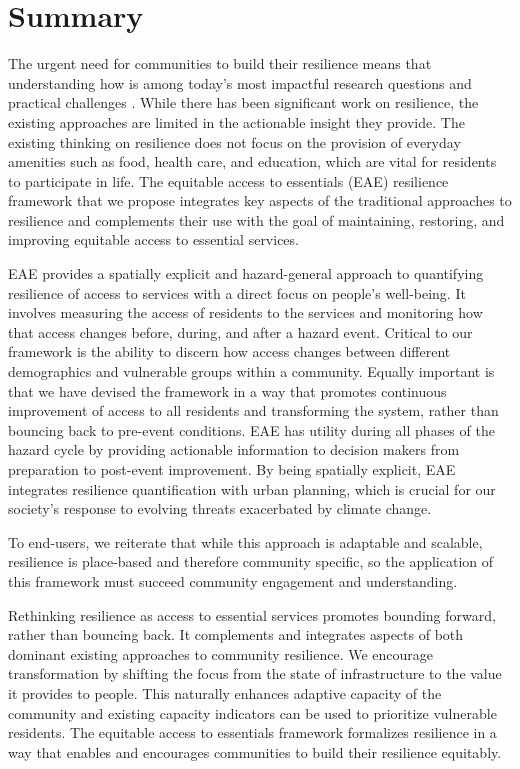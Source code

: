 \documentclass[onecolumn,doublespacing]{risa}
\let \cite \parencite
\begin{document}
\section{Summary}
\label{sec:disc}
The urgent need for communities to build their resilience means that understanding how is among today's most impactful research questions and practical challenges \cite{Caldarice2019-tv}.
While there has been significant work on resilience, the existing approaches are limited in the actionable insight they provide.
The existing thinking on resilience does not focus on the provision of everyday amenities such as food, health care, and education, which are vital for residents to participate in life.
The equitable access to essentials (EAE) resilience framework that we propose integrates key aspects of the traditional approaches to resilience and complements their use with the goal of maintaining, restoring, and improving equitable access to essential services.

EAE provides a spatially explicit and hazard-general approach to quantifying resilience of access to services with a direct focus on people's well-being. 
It involves measuring the access of residents to the services and monitoring how that access changes before, during, and after a hazard event. 
Critical to our framework is the ability to discern how access changes between different demographics and vulnerable groups within a community.
Equally important is that we have devised the framework in a way that promotes continuous improvement of access to all residents and transforming the system, rather than bouncing back to pre-event conditions.
EAE has utility during all phases of the hazard cycle by providing actionable information to decision makers from preparation to post-event improvement.
By being spatially explicit, EAE integrates resilience quantification with urban planning, which is crucial for our society's response to evolving threats exacerbated by climate change.

To end-users, we reiterate that while this approach is adaptable and scalable, resilience is place-based and therefore community specific, so the application of this framework must succeed community engagement and understanding.

Rethinking resilience as access to essential services promotes bounding forward, rather than bouncing back. It complements and integrates aspects of both dominant existing approaches to community resilience. We encourage transformation by shifting the focus from the state of infrastructure to the value it provides to people. This naturally enhances adaptive capacity of the community and existing capacity indicators can be used to prioritize vulnerable residents. The equitable access to essentials framework formalizes resilience in a way that enables and encourages communities to build their resilience equitably. 
\end{document}
